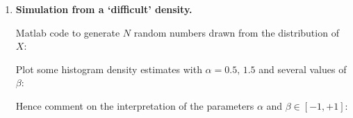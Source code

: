 \documentclass[12pt]{article}
\begin{document}
\begin{enumerate}
{\em Include your graphic here}
\vspace{3in}

\item {\bf Simulation from a `difficult'  density.}

Matlab code to generate $N$ random numbers drawn from the distribution of $X$:
\vspace{3in}

Plot some histogram density estimates with $\alpha=0.5,\,1.5$ and several values of $\beta$:

\vspace{3in}


Hence comment on the interpretation of the parameters $\alpha$ and $\beta\in[-1,+1]$:


\end{enumerate}
\end{document}
